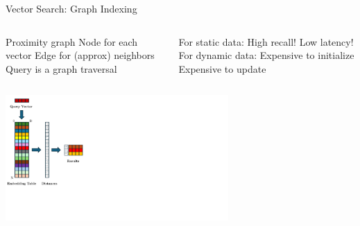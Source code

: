 \placelogofalse
\begin{frame}{Vector Search: Graph Indexing}
\begin{columns}
\centering
\begin{outline}
  \1 Proximity graph
  \2 Node for each vector
  \2 Edge for (approx) neighbors 
  \1 Query is a graph traversal 
\end{outline}

\begin{outline}
  \1 For static data:
  \2 High recall!
  \2 Low latency!
  \1 For dynamic data:
  \2 Expensive to initialize
  \2 Expensive to update 
\end{outline}
\end{columns}

\begin{center}
\centering

\includegraphics[width=8.5cm, page=3, trim={0 9cm 14cm 0cm},clip]{assets/vec_db_figs.pdf}

\end{center}
\end{frame}
\placelogotrue

